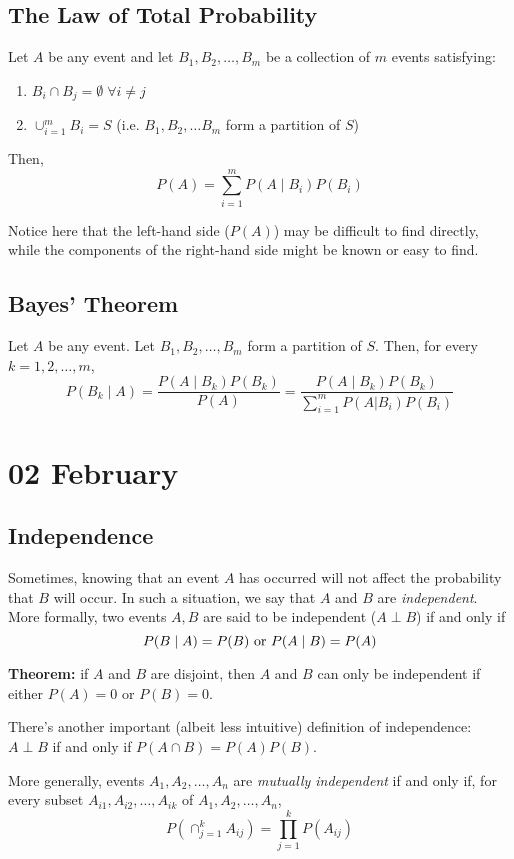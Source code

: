 \documentclass[12pt]{article}
\begin{document}
\subsection{The Law of Total Probability}
Let $A$ be any event and let $B_1, B_2, \dots, B_m$ be a collection of $m$ events satisfying:
\begin{enumerate}
    \item $B_i \cap B_j = \emptyset \; \forall i \neq j$
    \item $\cup_{i=1}^{m} B_i = S$ (i.e. $B_1, B_2, \dots B_m$ form a partition of $S$)
\end{enumerate}
Then,
\[
    P(A) = \sum_{i=1}^{m} P(A \; | \; B_i) P(B_i)
\]

Notice here that the left-hand side ($P(A)$) may be difficult to find directly, while the components of the right-hand side might be known or easy to find.

\subsection{Bayes' Theorem}
Let $A$ be any event. Let $B_1, B_2, \dots, B_m$ form a partition of $S$. Then, for every $k = 1, 2, \dots, m$,
\[
    P(B_k \; | \; A) = \frac{P(A \; | \; B_k) P(B_k)}{P(A)} = \frac{P(A \; | \; B_k) P(B_k)}{\sum_{i=1}^m P(A | B_i) P(B_i)}
\]

\section{02 February}
\subsection{Independence}
Sometimes, knowing that an event $A$ has occurred will not affect the probability that $B$ will occur. In such a situation, we say that $A$ and $B$ are \emph{independent}. More formally, two events $A,B$ are said to be independent ($A \perp B$) if and only if
\[
    P(B \; | \; A) = P(B) \textnormal{ or } P(A \; | \; B) = P(A)
\]

\textbf{Theorem:} if $A$ and $B$ are disjoint, then $A$ and $B$ can only be independent if either $P(A) = 0$ or $P(B) = 0$.

There's another important (albeit less intuitive) definition of independence: $A \perp B$ if and only if $P(A \cap B) = P(A)P(B)$. 

More generally, events $A_1, A_2, \dots, A_n$ are \emph{mutually independent} if and only if, for every subset $A_{i1}, A_{i2}, \dots, A_{ik}$ of $A_1, A_2, \dots, A_n$,
\[
    P(\cap_{j=1}^k A_{ij}) = \prod_{j=1}^k P(A_{ij})
\]
\end{document}
